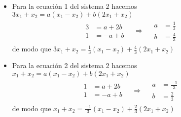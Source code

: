 \documentclass[10pt,a4paper]{jhwhw}
\begin{document}
\begin{itemize}
		\item Para la ecuación 1 del sistema 2 hacemos $3x_1+x_2=a(x_1-x_2)+b(2x_1+x_2)$
		\begin{align*}
		\begin{aligned}
		3&= a+2b \\
		1&=-a+b
		\end{aligned}
		\quad
		\Rightarrow
		\quad
		\begin{aligned}
		a&=\frac{1}{3} \\
		b&= \frac{4}{3}
		\end{aligned}
		\end{align*}
		de modo que $3x_1+x_2=\frac{1}{3}(x_1-x_2)+\frac{4}{3}(2x_1+x_2)$
		\item Para la ecuación 2 del sistema 2 hacemos $x_1+x_2=a(x_1-x_2)+b(2x_1+x_2)$
		\begin{align*}
		\begin{aligned}
		1&= a+2b \\
		1&=-a+b
		\end{aligned}
		\quad
		\Rightarrow
		\quad
		\begin{aligned}
		a&=\frac{-1}{3} \\
		b&= \frac{2}{3}
		\end{aligned}
		\end{align*}
		de modo que $x_1+x_2=\frac{-1}{3}(x_1-x_2)+\frac{2}{3}(2x_1+x_2)$
	\end{itemize}
	
	
	
\end{document}
